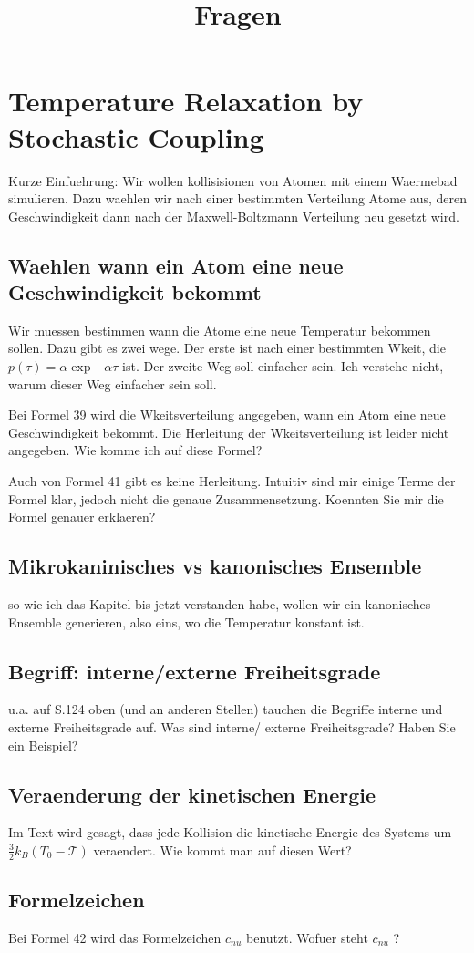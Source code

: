 \documentclass[]{article}
\title{Fragen}
\begin{document}
\maketitle

\section{Temperature Relaxation by Stochastic Coupling}

Kurze Einfuehrung: Wir wollen kollisisionen von Atomen mit einem Waermebad simulieren.
Dazu waehlen wir nach einer bestimmten Verteilung Atome aus, deren Geschwindigkeit dann nach der Maxwell-Boltzmann Verteilung neu gesetzt wird. 

\subsection{Waehlen wann ein Atom eine neue Geschwindigkeit bekommt}
Wir muessen bestimmen wann die Atome eine neue Temperatur bekommen sollen. Dazu gibt es zwei wege. Der erste ist nach einer bestimmten Wkeit, die $p(\tau)= \alpha \exp{- \alpha \tau}$ ist. Der zweite Weg soll einfacher sein. Ich verstehe nicht, warum dieser Weg einfacher sein soll. 

Bei Formel 39 wird die Wkeitsverteilung angegeben, wann ein Atom eine neue Geschwindigkeit bekommt. Die Herleitung der Wkeitsverteilung ist leider nicht angegeben. Wie komme ich auf diese Formel? 

Auch von Formel 41 gibt es keine Herleitung. Intuitiv sind mir einige Terme der Formel klar, jedoch nicht die genaue Zusammensetzung. Koennten Sie mir die Formel genauer erklaeren? 

\subsection{Mikrokaninisches vs kanonisches Ensemble}
so wie ich das Kapitel bis jetzt verstanden habe, wollen wir ein kanonisches Ensemble generieren, also eins, wo die Temperatur konstant ist. 


\subsection{Begriff: interne/externe Freiheitsgrade}
u.a. auf S.124 oben (und an anderen Stellen) tauchen die Begriffe interne und externe Freiheitsgrade auf. Was sind interne/ externe Freiheitsgrade? Haben Sie ein Beispiel?  

\subsection{Veraenderung der kinetischen Energie}
Im Text wird gesagt, dass jede Kollision die kinetische Energie des Systems um $\frac{3}{2} k_B (T_0-\mathcal{T})$ veraendert. Wie kommt man auf diesen Wert? 

\subsection{Formelzeichen}
Bei Formel 42 wird das Formelzeichen $c_{nu}$ benutzt. Wofuer steht $c_{nu}$ ?
\end{document}
